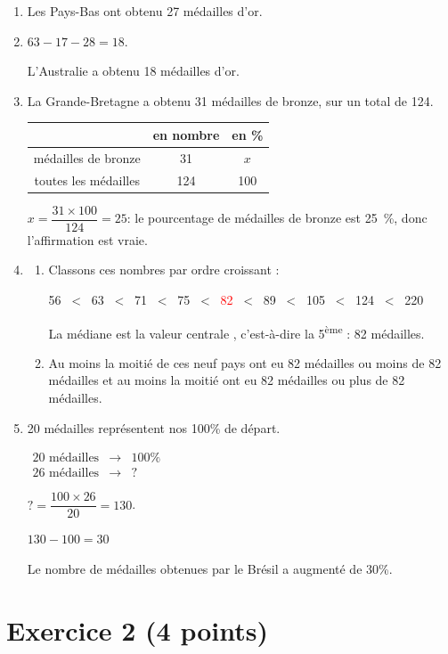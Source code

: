 \documentclass[12pt,a4paper,french]{article}
\providecommand{\up}{\textsuperscript}
\begin{document}
\begin{enumerate}
	\item Les Pays-Bas ont obtenu 27 médailles d'or.
	\item $63-17-28=18$.
	
L'Australie a obtenu 18 médailles d'or.
	\item La Grande-Bretagne a obtenu 31 médailles de bronze, sur un total de 124.
	
		\begin{tabular}{c|c|c}
		&en nombre  &en \% \\\hline
médailles de bronze		& 31 &$x$  \\\hline
toutes les médailles&124&100\\
	\end{tabular}
	
	
	$x=\dfrac{31\times100}{124}=25$: le pourcentage de médailles de bronze est 25~\%, donc l'affirmation est vraie.
	\item 	\begin{enumerate}
				\item Classons ces nombres par ordre croissant :
				
				56 ~<~ 63 ~<~ 71 ~<~ 75 ~<~ \textcolor{red}{82} ~<~ 89 ~<~ 105 ~<~ 124 ~<~ 220
				
				La médiane est la valeur \og centrale \fg{}, c'est-à-dire la 5\up{ème} : 82 médailles.
				\item Au moins la moitié de ces neuf pays ont eu 82 médailles ou moins de 82 médailles et au moins la moitié ont eu 82 médailles ou plus de 82 médailles.
			\end{enumerate}
	\item 20 médailles représentent nos 100\% de départ.
	
	\(\begin{array}{ccc}
	20 \text{ médailles}& \to & 100\%\\
	26 \text{ médailles}& \to & ?
	\end{array}\)
	
	$?=\dfrac{100\times 26 }{20}=130$.
	
	$130-100=30$
	
	Le nombre de médailles obtenues par le Brésil a augmenté de 30\%.
\end{enumerate}

\section*{Exercice 2 (4 points)}
\end{document}
